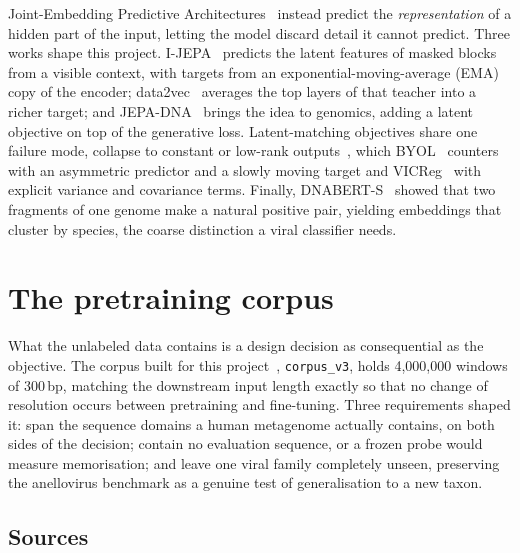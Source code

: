 \documentclass[10pt,twocolumn,a4paper]{article}
\begin{document}
Joint-Embedding Predictive Architectures~\cite{lecun2022path} instead predict the
\emph{representation} of a hidden part of the input, letting the model discard
detail it cannot predict. Three works shape this project.
I-JEPA~\cite{assran2023ijepa} predicts the latent features of masked blocks from
a visible context, with targets from an exponential-moving-average (EMA) copy of
the encoder; data2vec~\cite{baevski2022data2vec} averages the top layers of that
teacher into a richer target; and JEPA-DNA~\cite{larey2026jepadna} brings the
idea to genomics, adding a latent objective on top of the generative loss.
Latent-matching objectives share one failure mode, collapse to constant or
low-rank outputs~\cite{jing2022dimensional}, which BYOL~\cite{grill2020byol}
counters with an asymmetric predictor and a slowly moving target and
VICReg~\cite{bardes2022vicreg} with explicit variance and covariance terms.
Finally, DNABERT-S~\cite{zhou2024dnaberts} showed that two fragments of one
genome make a natural positive pair, yielding embeddings that cluster by
species, the coarse distinction a viral classifier needs.

\section{The pretraining corpus}\label{sec:corpus}

What the unlabeled data contains is a design decision as consequential as the
objective. The corpus built for this project~\cite{grigolin2026corpus},
\texttt{corpus\_v3}, holds 4{,}000{,}000 windows of 300\,bp, matching the
downstream input length exactly so that no change of resolution occurs between
pretraining and fine-tuning. Three requirements shaped it: span the sequence
domains a human metagenome actually contains, on both sides of the decision;
contain no evaluation sequence, or a frozen probe would measure memorisation; and
leave one viral family completely unseen, preserving the anellovirus benchmark as
a genuine test of generalisation to a new taxon.

\subsection{Sources}
\end{document}
